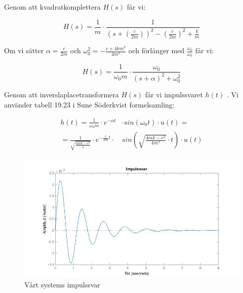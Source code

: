 \documentclass[10pt,a4paper]{article}
\begin{document}
Genom att kvadratkomplettera $H(s)$ får vi:

\begin{equation}
H(s) = \frac{1}{m} \cdot \frac{1}{(s+(\frac{c}{2  m}))^2-(\frac{c}{2  m})^2+\frac{k}{m}} 
\end{equation}

Om vi sätter $\alpha = \frac{c}{2m}$ och $\omega_0^2 = {-\frac{c + 4 k  m^2}{4  m^2}}$ och förlänger med $\frac{\omega_0}{\omega_0}$ får vi:

\begin{equation}
H(s) = \frac{1}{\omega_0  m} \cdot \frac{\omega_0}{(s + \alpha)^2 +\omega_0^2}
\end{equation}

Genom att inverslaplacetransformera $H(s)$ får vi impulssvaret $h(t)$ \cite[s.~207]{sune2000}. Vi använder tabell 19.23 i Sune Söderkvist formelsamling:

\begin{equation}
\begin{split}
h(t) = \frac{1}{\omega_0  m} \cdot  e^{-\alpha  t} & \cdot  sin(\omega_0  t) \cdot u(t) = \\ = \frac{1}{\sqrt{\frac{4  m  k - c^2}{4}} } \cdot  e^{-\frac{c}{2m} t} \cdot & sin(\sqrt{\frac{4  m  k - c^2}{4  m^2}} \cdot t) \cdot u(t)
\end{split}
\end{equation}



\begin{figure}[h]
\begin{center}

\includegraphics[scale=0.5]{Impulssvar}
\caption{Vårt systems impulssvar}
\end{center}
\end{figure}
\end{document}
